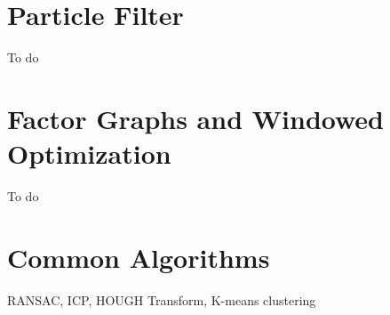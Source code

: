 \documentclass[a4paper,11pt]{article}
\begin{document}
\newpage


\newpage
\section{Particle Filter}
To do

\newpage
\section{Factor Graphs and Windowed Optimization}
To do

\newpage
\section{Common Algorithms}
RANSAC, ICP, HOUGH Transform, K-means clustering

\newpage


\end{document}
